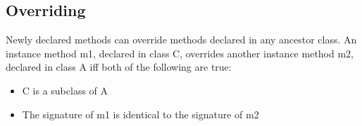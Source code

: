 \begin{homeworkProblem}
	\subsection{Overriding}
	Newly declared methods can override methods declared in any ancestor class. An instance method m1, declared in class C, overrides another instance method m2, declared in class A iff both of the following are true:
	\begin{itemize}
		\item C is a subclass of A
		\item The signature of m1 is identical to the signature of m2
	\end{itemize}
	
\end{homeworkProblem}
